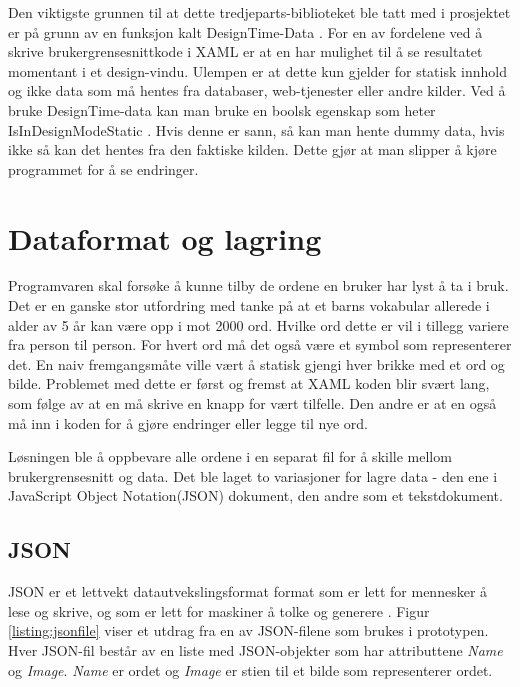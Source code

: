 Den viktigste grunnen til at dette tredjeparts-biblioteket ble tatt med i prosjektet er på grunn av en funksjon kalt DesignTime-Data \cite{MVVMLightDoc:online}. For en av fordelene ved å skrive brukergrensesnittkode i XAML er at en har mulighet til å se resultatet momentant i et design-vindu. Ulempen er at dette kun gjelder for statisk innhold og ikke data som må hentes fra databaser, web-tjenester eller andre kilder. Ved å bruke DesignTime-data kan man bruke en boolsk egenskap som heter IsInDesignModeStatic \cite{MVVM100123:online}. Hvis denne er sann, så kan man hente dummy data, hvis ikke så kan det hentes fra den faktiske kilden. Dette gjør at man slipper å kjøre programmet for å se endringer. 


\section{Dataformat og lagring}


Programvaren skal forsøke å kunne tilby de ordene en bruker har lyst å ta i bruk. Det er en ganske stor utfordring med tanke på at et barns vokabular allerede i alder av 5 år kan være opp i mot 2000 ord. Hvilke ord dette er vil i tillegg variere fra person til person. For hvert ord må det også være et symbol som representerer det. En naiv fremgangsmåte ville vært å statisk gjengi hver brikke med et ord og bilde. Problemet med dette er først og fremst at XAML koden blir svært lang, som følge av at en må skrive en knapp for vært tilfelle. Den andre er at en også må inn i koden for å gjøre endringer eller legge til nye ord. 

Løsningen ble å oppbevare alle ordene i en separat fil for å skille mellom brukergrensesnitt og data. Det ble laget to variasjoner for lagre data - den ene i JavaScript Object Notation(JSON) dokument, den andre som et tekstdokument.

\subsection{JSON}

JSON er et lettvekt datautvekslingsformat format som er lett for mennesker å lese og skrive, og som er lett for maskiner å tolke og generere \cite{JSON7:online}. Figur \ref{listing:jsonfile} viser et utdrag fra en av JSON-filene som brukes i prototypen. Hver JSON-fil består av en liste med JSON-objekter som har attributtene \textit{Name} og \textit{Image}. \textit{Name} er ordet og \textit{Image} er stien til et bilde som representerer ordet. 

